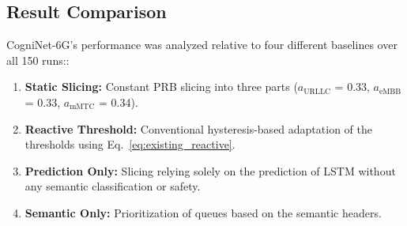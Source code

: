 \documentclass[twocolumn,10pt,twoside]{article}
\begin{document}
\begin{table}[htbp]
\centering
\small
\caption{CogniNet-6G micro-latency execution timing budget breakdown per module compared against O-RAN Near-RT RIC deadline}
\label{tab:timing_breakdown}
\end{table}

\subsection{Result Comparison}
CogniNet-6G's performance was analyzed relative to four different baselines over all 150 runs::
\begin{enumerate}
    \item \textbf{Static Slicing:} Constant PRB slicing into three parts ($a_{\text{URLLC}}$ = 0.33, $a_{\text{eMBB}}$ = 0.33, $a_{\text{mMTC}}$ = 0.34).
    \item \textbf{Reactive Threshold:} Conventional hysteresis-based adaptation of the thresholds using Eq.~\eqref{eq:existing_reactive}.
    \item \textbf{Prediction Only:} Slicing relying solely on the prediction of LSTM without any semantic classification or safety.
    \item \textbf{Semantic Only:} Prioritization of queues based on the semantic headers.
\end{enumerate}
\end{document}
